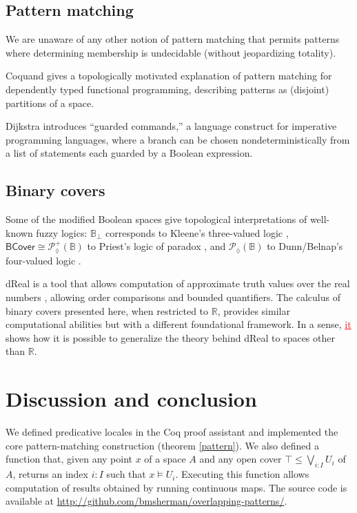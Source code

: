 \documentclass[conference]{IEEEtran}
\newcommand{\PLower}{\mathcal{P}_\lozenge}
\newcommand{\R}{\mathbb{R}}
\newcommand{\bool}{\mathbb{B}}
\newcommand{\BCover}{\mathsf{BCover}}
\newcommand{\grammar}[1]{\textcolor{red}{\underline{#1}}}
\begin{document}
\subsection{Pattern matching}

We are unaware of any other notion of pattern matching that permits patterns where determining membership is undecidable (without jeopardizing totality).

Coquand \cite{coquand1992} gives a topologically motivated explanation of pattern matching for dependently typed functional programming, describing patterns as (disjoint) partitions of a space.

Dijkstra \cite{dijkstra} introduces ``guarded commands,'' a language construct for imperative programming languages, where a branch can be chosen nondeterministically from a list of statements each guarded by a Boolean expression.

\subsection{Binary covers}

Some of the modified Boolean spaces give topological interpretations of well-known fuzzy logics: $\bool_\bot$ corresponds to Kleene's three-valued logic \cite{kleenemetamathematics}, $\BCover \cong \PLower^+(\bool)$ to Priest's logic of paradox \cite{priest}, and $\PLower(\bool)$ to Dunn/Belnap's four-valued logic \cite{sep-logic-manyvalued}.

dReal is a tool that allows computation of approximate truth values over the real numbers \cite{dReal}, allowing order comparisons and bounded quantifiers. The calculus of binary covers presented here, when restricted to $\R$, provides similar computational abilities but with a different foundational framework. In a sense, \grammar{it} shows how it is possible to generalize the theory behind dReal to spaces other than $\R$.

\section{Discussion and conclusion}

We defined predicative locales in the Coq proof assistant and implemented the core pattern-matching construction (theorem \ref{pattern}). We also defined a function that, given any point $x$ of a space $A$ and any open cover $\top \le \bigvee_{i : I} U_i$ of $A$, returns an index $i : I$ such that $x \models U_i$. Executing this function allows computation of results obtained by running continuous maps. The source code is available at \href{http://github.com/bmsherman/overlapping-patterns/}{http://github.com/bmsherman/overlapping-patterns/}.
\end{document}
